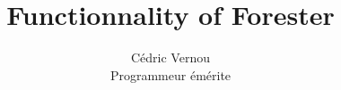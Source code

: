 \documentclass[11pt]{article}
\begin{document}
\title{Functionnality of Forester}
\author{Cédric Vernou\\
Programmeur émérite}

\maketitle
\tableofcontents
\newpage






\printglossaries

%
%
\end{document}
